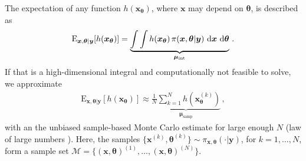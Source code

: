 The expectation of any function $h(\bm{x}_{\bm{\theta}})$, where $\bm{x}$ may depend on $\bm{\theta}$, is described as 
\begin{align}
	\text{E}_{\bm{x},\bm{\theta}|\bm{y}} [h(\bm{x}_{\bm{\theta}})] =  \underbrace{\int \int   h(\bm{x}_{\bm{\theta}}) \,  \pi(\bm{x}, \bm{\theta} | \bm{y} ) \, \mathop{}\!\mathrm{d} \bm{x}  \, \mathop{}\!\mathrm{d} \bm{\theta}}_{\bm{\mu}_{\text{int}}}   \label{eq:expPos} \, .
\end{align}
If that is a high-dimensional integral and computationally not feasible to solve, we approximate 
\begin{align}
	\label{eq:sampMean}
	\text{E}_{\bm{x},\bm{\theta}|\bm{y}} [h(\bm{x}_{\bm{\theta}})] \approx \underbrace{ \frac{1}{N} \sum_{k=1}^{N} h(\bm{x}^{(k)}_{\bm{\theta}})  }_{\bm{\mu}_{\text{samp}}} \, ,
\end{align}
with an the unbiased sample-based Monte Carlo estimate \cite{roberts2004general} for large enough $N$ (law of large numbers \cite[Chapter 17]{tweedie2009measprob}).
Here, the samples $\{\bm{x}^{(k)},\bm{\theta}^{(k)} \}\sim \pi_{\bm{x}, \bm{\theta}}(\cdot|\bm{y})$, for $k = 1, \dots, N$, form a sample set $\mathcal{M} =\{ (\bm{x},\bm{\theta})^{(1)}, \dots ,  (\bm{x},\bm{\theta})^{(N)} \}$.

